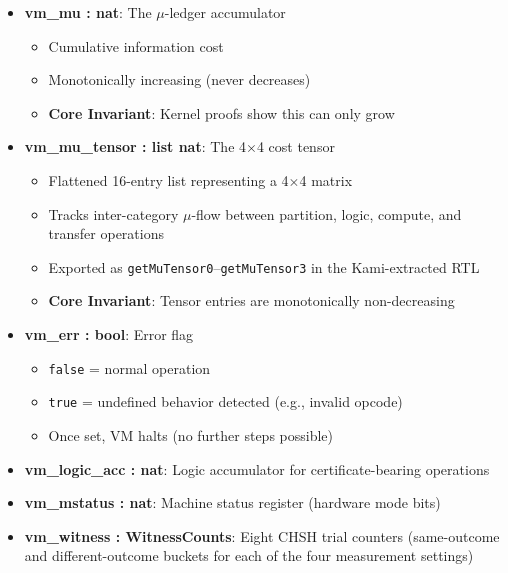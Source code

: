 \begin{itemize}
\begin{itemize}
        \item Points to current instruction
        \item Increments by 1 after each step (instructions are unit-indexed in formal model)
        \item Hardware uses byte addressing (increments by 4)
    \end{itemize}
    \item \textbf{vm\_mu : nat}: The $\mu$-ledger accumulator
    \begin{itemize}
        \item Cumulative information cost
        \item Monotonically increasing (never decreases)
        \item \textbf{Core Invariant}: Kernel proofs show this can only grow
    \end{itemize}
    \item \textbf{vm\_mu\_tensor : list nat}: The 4$\times$4 cost tensor
    \begin{itemize}
        \item Flattened 16-entry list representing a 4$\times$4 matrix
        \item Tracks inter-category $\mu$-flow between partition, logic, compute, and transfer operations
        \item Exported as \texttt{getMuTensor0}--\texttt{getMuTensor3} in the Kami-extracted RTL
        \item \textbf{Core Invariant}: Tensor entries are monotonically non-decreasing
    \end{itemize}
    \item \textbf{vm\_err : bool}: Error flag
    \begin{itemize}
        \item \texttt{false} = normal operation
        \item \texttt{true} = undefined behavior detected (e.g., invalid opcode)
        \item Once set, VM halts (no further steps possible)
    \end{itemize}
    \item \textbf{vm\_logic\_acc : nat}: Logic accumulator for certificate-bearing operations
    \item \textbf{vm\_mstatus : nat}: Machine status register (hardware mode bits)
    \item \textbf{vm\_witness : WitnessCounts}: Eight CHSH trial counters (same-outcome and different-outcome buckets for each of the four measurement settings)

\end{itemize}
